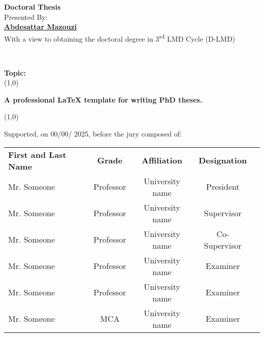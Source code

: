 \begin{titlepage}
	\begin{center}
		\LARGE\textbf{Doctoral Thesis} \\
		\vspace{0.3cm}
				\Large Presented By: \\ 
\vspace{0.3cm}
		\Large\textbf{ \href{https://scholar.google.com/citations?user=dPEQUpsAAAAJ&hl=en}{Abdesattar Mazouzi}}\\
		\vspace{0.3cm}
		\Large
		  With a view to obtaining the doctoral degree in  3\textsuperscript{rd} LMD Cycle (D-LMD) \\
		  \vspace{0.3cm}
	\end{center}
	 \\
	
	\raggedright \large \textbf{Topic:} \\

	\line(1,0){\textwidth} \\
	\begin{center}		
		\Large	
		 \textbf{ A professional LaTeX template for writing PhD theses. }
	\end{center}
	\line(1,0){\textwidth} \\ 
	
	\vspace{0.3cm} 
	\raggedright
	\large Supported, on 00/00/ 2025, before the jury composed of: 
	\begin{table}[h!]
		\centering
		\renewcommand{\arraystretch}{1.5} %
		\setlength{\tabcolsep}{18pt}       %
		\large
		\begin{tabular}{lcccc}
		
			\textbf{First and Last Name}   & \textbf{Grade} & \textbf{Affiliation } & \textbf{Designation } \\ 
		Mr.  Someone	     & Professor & University name & President  \\ 
			Mr. Someone      & Professor & University name & Supervisor  \\ 
			Mr. Someone      & Professor & University name & Co-Supervisor   \\ 
			Mr. Someone      & Professor & University name & Examiner  \\ 
			Mr. Someone      & Professor & University name & Examiner  \\ 
		    Mr. Someone      & MCA       & University name & Examiner  \\ 
		
		\end{tabular}
		\label{Tab0:jury}
	\end{table}
	
	\vfill %
	
\end{titlepage}
\restoregeometry

